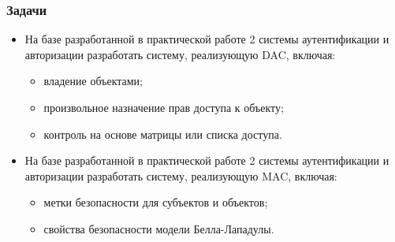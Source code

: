 \documentclass[areasetadvanced]{scrartcl}
\begin{document}
\subsubsection{Задачи}
\begin{itemize}
    \item На базе разработанной в практической работе 2 системы аутентификации
    и авторизации разработать систему, реализующую DAC, включая: \begin{itemize}
        \item владение объектами;
        \item произвольное назначение прав доступа к объекту;
        \item контроль на основе матрицы или списка доступа.
        \end{itemize}
    \item На базе разработанной в практической работе 2 системы аутентификации
    и авторизации разработать систему, реализующую MAC, включая: \begin{itemize}
        \item метки безопасности для субъектов и объектов;
        \item свойства безопасности модели Белла-Лападулы.
        \end{itemize}
\end{itemize}
\end{document}

